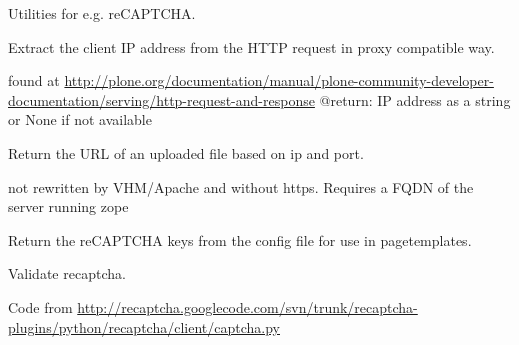 \documentclass[a4paper,10pt,ngerman]{sphinxmanual}
\begin{document}
\begin{fulllineitems}
\label{tools:Products.DiPP.Utils.Utils}
Utilities for e.g. reCAPTCHA.

\begin{fulllineitems}
\label{tools:Products.DiPP.Utils.Utils.get_ip}
Extract the client IP address from the HTTP request in proxy compatible way.

found at \href{http://plone.org/documentation/manual/plone-community-developer-documentation/serving/http-request-and-response}{http://plone.org/documentation/manual/plone-community-developer-documentation/serving/http-request-and-response}
@return: IP address as a string or None if not available

\end{fulllineitems}


\begin{fulllineitems}
\label{tools:Products.DiPP.Utils.Utils.get_location}
Return the URL of an uploaded file based on ip and port.

not rewritten by VHM/Apache and without https. Requires a
FQDN of the server running zope

\end{fulllineitems}


\begin{fulllineitems}
\label{tools:Products.DiPP.Utils.Utils.get_recaptcha_keys}
Return the reCAPTCHA keys from the config file for use in pagetemplates.

\end{fulllineitems}


\begin{fulllineitems}
\label{tools:Products.DiPP.Utils.Utils.validate_recaptcha}
Validate recaptcha.

Code from
\href{http://recaptcha.googlecode.com/svn/trunk/recaptcha-plugins/python/recaptcha/client/captcha.py}{http://recaptcha.googlecode.com/svn/trunk/recaptcha-plugins/python/recaptcha/client/captcha.py}

\end{fulllineitems}


\end{fulllineitems}
\end{document}
